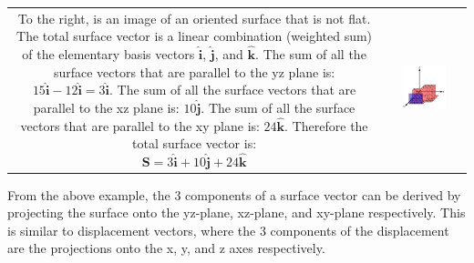 \documentclass{article}
\begin{document}
\begin{tabular}{cc}
\parbox{0.4\textwidth}{
To the right, is an image of an oriented surface that is not flat. The total surface vector is a linear combination (weighted sum) of the elementary basis vectors \(\hat{\mathbf{i}}\), \(\hat{\mathbf{j}}\), and \(\hat{\mathbf{k}}\). The sum of all the surface vectors that are parallel to the yz plane is: \(15\hat{\mathbf{i}} - 12\hat{\mathbf{i}} = 3\hat{\mathbf{i}}\). The sum of all the surface vectors that are parallel to the xz plane is: \(10\hat{\mathbf{j}}\). The sum of all the surface vectors that are parallel to the xy plane is: \(24\hat{\mathbf{k}}\). Therefore the total surface vector is:     
\[\mathbf{S} = 3\hat{\mathbf{i}} + 10\hat{\mathbf{j}} + 24\hat{\mathbf{k}}\]
} & \parbox{0.6\textwidth}{\includegraphics[width = 0.6\textwidth]{oriented_surface_1}}
\end{tabular}

From the above example, the 3 components of a surface vector can be derived by projecting the surface onto the yz-plane, xz-plane, and xy-plane respectively. This is similar to displacement vectors, where the 3 components of the displacement are the projections onto the x, y, and z axes respectively.   
\end{document}
